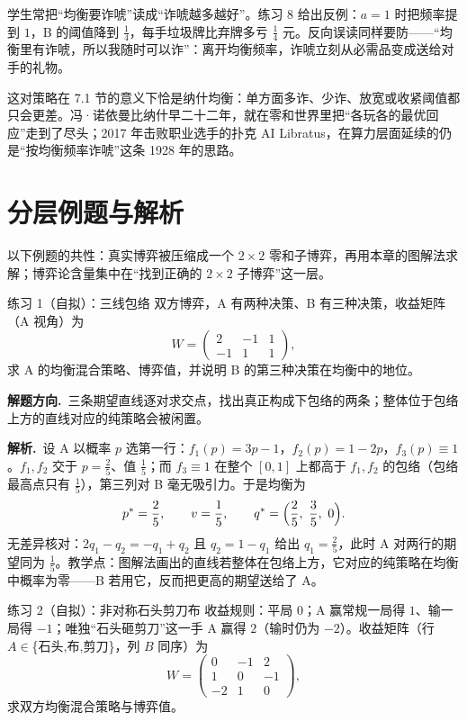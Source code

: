\documentclass[UTF8,a4paper,11pt,oneside,openany,fontset=fandol]{ctexbook}
\theoremstyle{definition}
\newcommand{\sol}{\par\noindent\textbf{解析.}\ }
\newcommand{\hint}{\par\noindent\textbf{解题方向.}\ }
\begin{document}
\begin{pitfall}[诈唬不是越多越好]
学生常把“均衡要诈唬”读成“诈唬越多越好”。练习 8 给出反例：$a=1$ 时把频率提到 $1$，B 的阈值降到 $\tfrac14$，每手垃圾牌比弃牌多亏 $\tfrac14$ 元。反向误读同样要防——“均衡里有诈唬，所以我随时可以诈”：离开均衡频率，诈唬立刻从必需品变成送给对手的礼物。
\end{pitfall}

这对策略在 7.1 节的意义下恰是纳什均衡：单方面多诈、少诈、放宽或收紧阈值都只会更差。冯·诺依曼比纳什早二十二年，就在零和世界里把“各玩各的最优回应”走到了尽头；2017 年击败职业选手的扑克 AI Libratus，在算力层面延续的仍是“按均衡频率诈唬”这条 1928 年的思路。

\section{分层例题与解析}

以下例题的共性：真实博弈被压缩成一个 $2\times2$ 零和子博弈，再用本章的图解法求解；博弈论含量集中在“找到正确的 $2\times2$ 子博弈”这一层。


\begin{problem}{练习 1（自拟）：三线包络}
双方博弈，A 有两种决策、B 有三种决策，收益矩阵（A 视角）为
\[
 W=\begin{pmatrix}2&-1&1\\-1&1&1\end{pmatrix},
\]
求 A 的均衡混合策略、博弈值，并说明 B 的第三种决策在均衡中的地位。
\end{problem}

\hint 三条期望直线逐对求交点，找出真正构成下包络的两条；整体位于包络上方的直线对应的纯策略会被闲置。

\sol 设 A 以概率 $p$ 选第一行：$f_1(p)=3p-1$，$f_2(p)=1-2p$，$f_3(p)\equiv1$。$f_1,f_2$ 交于 $p=\tfrac25$、值 $\tfrac15$；而 $f_3\equiv1$ 在整个 $[0,1]$ 上都高于 $f_1,f_2$ 的包络（包络最高点只有 $\tfrac15$），第三列对 B 毫无吸引力。于是均衡为
\[
 p^{*}=\frac25,\qquad v=\frac15,\qquad q^{*}=\Bigl(\frac25,\ \frac35,\ 0\Bigr).
\]
无差异核对：$2q_1-q_2=-q_1+q_2$ 且 $q_2=1-q_1$ 给出 $q_1=\tfrac25$，此时 A 对两行的期望同为 $\tfrac15$。教学点：图解法画出的直线若整体在包络上方，它对应的纯策略在均衡中概率为零——B 若用它，反而把更高的期望送给了 A。

\begin{problem}{练习 2（自拟）：非对称石头剪刀布}
收益规则：平局 $0$；A 赢常规一局得 $1$、输一局得 $-1$；唯独“石头砸剪刀”这一手 A 赢得 $2$（输时仍为 $-2$）。收益矩阵（行 $A\in$\{石头,布,剪刀\}，列 $B$ 同序）为
\[
 W=\begin{pmatrix}0&-1&2\\1&0&-1\\-2&1&0\end{pmatrix},
\]
求双方均衡混合策略与博弈值。
\end{problem}
\end{document}
